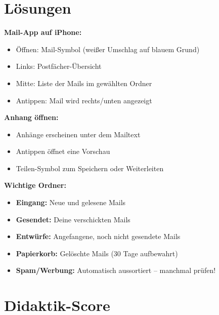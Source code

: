 \documentclass[11pt,a4paper]{article}
\begin{document}
\section{Lösungen}

\textbf{Mail-App auf iPhone:}
\begin{itemize}
    \item Öffnen: Mail-Symbol (weißer Umschlag auf blauem Grund)
    \item Links: Postfächer-Übersicht
    \item Mitte: Liste der Mails im gewählten Ordner
    \item Antippen: Mail wird rechts/unten angezeigt
\end{itemize}

\textbf{Anhang öffnen:}
\begin{itemize}
    \item Anhänge erscheinen unter dem Mailtext
    \item Antippen öffnet eine Vorschau
    \item Teilen-Symbol zum Speichern oder Weiterleiten
\end{itemize}

\textbf{Wichtige Ordner:}
\begin{itemize}
    \item \textbf{Eingang:} Neue und gelesene Mails
    \item \textbf{Gesendet:} Deine verschickten Mails
    \item \textbf{Entwürfe:} Angefangene, noch nicht gesendete Mails
    \item \textbf{Papierkorb:} Gelöschte Mails (30 Tage aufbewahrt)
    \item \textbf{Spam/Werbung:} Automatisch aussortiert -- manchmal prüfen!
\end{itemize}

\section{Didaktik-Score}
\end{document}
